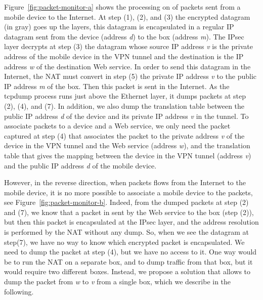 Figure~\ref{fig:packet-monitor-a} shows the processing on \platname{}
of packets sent from a mobile device to the Internet. At step (1),
(2), and (3) the encrypted datagram (in gray) goes up the layers, this
datagram is encapsulated in a regular IP datagram sent from the device
(address \emph{d}) to the \platname{} box (address \emph{m}). The
IPsec layer decrypts at step (3) the datagram whose source IP address
\emph{v} is the private address of the mobile device in the VPN tunnel
and the destination is the IP address \emph{w} of the destination Web
service. In order to send this datagram in the Internet, the NAT must
convert in step (5) the private IP address \emph{v} to the public IP
address \emph{m} of the \platname{} box. Then this packet is sent in
the Internet. As the tcpdump process runs just above the Ethernet
layer, it dumps packets at step (2), (4), and (7). In addition, we
also dump the translation table between the public IP address \emph{d}
of the device and its private IP address \emph{v} in the tunnel. To
associate packets to a device and a Web service, we only need the
packet captured at step (4) that associates the packet to the private
address \emph{v} of the device in the VPN tunnel and the Web service
(address \emph{w}), and the translation table that gives the
mapping between the device in the VPN tunnel (address \emph{v}) and
the public IP address \emph{d} of the mobile device.

However, in the reverse direction, when packets flows from the
Internet to the mobile device, it is no more possible to associate a
mobile device to the packets, see
Figure~\ref{fig:packet-monitor-b}. Indeed, from the dumped packets at
step (2) and (7), we know that a packet in sent by the Web service to
the \platname{} box (step (2)), but then this packet is encapsulated
at the IPsec layer, and the address resolution is performed by the NAT
without any dump. So, when we see the datagram at step(7), we have no
way to know which encrypted packet is encapsulated. We need to dump
the packet at step (4), but we have no access to it. One way would be
to run the NAT on a separate box, and to dump traffic from that box,
but it would require two different boxes. Instead, we propose a
solution that allows to dump the packet from \emph{w} to \emph{v} from
a single box, which we describe in the following. 

